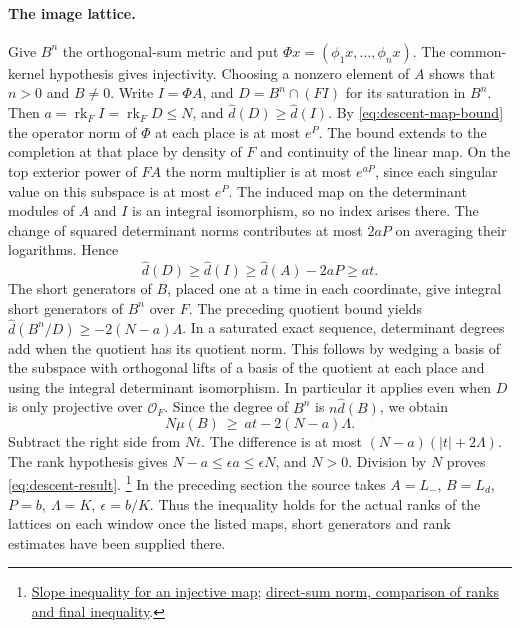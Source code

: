 \paragraph{The image lattice.}
Give \(B^n\) the orthogonal-sum metric and put
\(\Phi x=(\phi_1x,\ldots,\phi_nx)\).
The common-kernel hypothesis gives injectivity. Choosing a nonzero
element of \(A\) shows that \(n>0\) and \(B\ne0\). Write \(I=\Phi A\),
and \(D=B^n\cap (F I)\) for its saturation in \(B^n\).
Then \(a=\operatorname{rk}_F I=\operatorname{rk}_F D\le N\), and
\(\widehat d(D)\ge\widehat d(I)\). By
\eqref{eq:descent-map-bound} the operator norm of \(\Phi\) at each
place is at most \(e^P\). The bound extends to the completion at that
place by density of \(F\) and continuity of the linear map.
On the top exterior power of \(F A\) the norm multiplier is at most
\(e^{aP}\), since each singular value on this subspace is at most
\(e^P\). The induced map on the determinant modules of \(A\) and
\(I\) is an integral isomorphism, so no index arises there. The
change of squared determinant norms contributes at most \(2aP\)
on averaging their logarithms. Hence
\[
             \widehat d(D)\ge\widehat d(I)
             \ge\widehat d(A)-2aP \ge at .
\]
The short generators of \(B\), placed one at a time in each coordinate,
give integral short generators of \(B^n\) over \(F\). The preceding
quotient bound yields \(\widehat d(B^n/D)\ge-2(N-a)\Lambda\).
In a saturated exact sequence, determinant degrees add when the
quotient has its quotient norm. This follows by wedging a basis of
the subspace with orthogonal lifts of a basis of the quotient at each
place and using the integral determinant isomorphism. In particular
it applies even when \(D\) is only projective over \(\mathcal O_F\).
Since the degree of \(B^n\) is \(n\widehat d(B)\), we obtain
\[
                 N\mu(B)\ \ge\ at-2(N-a)\Lambda .
\]
Subtract the right side from \(Nt\). The difference is at most
\((N-a)(|t|+2\Lambda)\). The rank hypothesis gives
\(N-a\le\epsilon a\le\epsilon N\), and \(N>0\).
Division by \(N\) proves \eqref{eq:descent-result}.
\footnote{\href{https://github.com/Deicyde/riemann-hypothesis/blob/40e56bab/src/Formalism/MeanHeightDescent/AverageDegreeBounds/DescentSlope.lean}{Slope inequality for an injective map};
\href{https://github.com/Deicyde/riemann-hypothesis/blob/40e56bab/src/Development/AbelianVarietyTheory/Proofs/DivisorProofs/HtMapLeOfPoints.lean}{direct-sum norm, comparison of ranks and final inequality}.}
In the preceding section the source takes \(A=L_-\), \(B=L_d\),
\(P=b,\ \Lambda=K,\ \epsilon=b/K\). Thus the inequality holds for
the actual ranks of the lattices on each window once the listed maps,
short generators and rank estimates have been supplied there.
